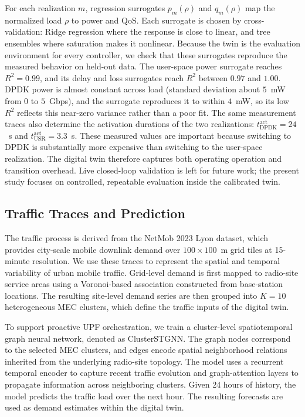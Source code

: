\documentclass[10pt,conference,letterpaper]{IEEEtran}
\begin{document}
For each realization $m$, regression surrogates $p_m(\rho)$ and $q_m(\rho)$ map
the normalized load $\rho$ to power and QoS. Each surrogate is chosen by
cross-validation: Ridge regression where the response is close to linear, and
tree ensembles where saturation makes it nonlinear. Because the twin is the
evaluation environment for every controller, we check that these surrogates
reproduce the measured behavior on held-out data. The user-space power surrogate
reaches $R^2=0.99$, and its delay and loss surrogates reach $R^2$ between $0.97$
and $1.00$. DPDK power is almost constant across load (standard deviation about
$5$~mW from $0$ to $5$~Gbps), and the surrogate reproduces it to within $4$~mW,
so its low $R^2$ reflects this near-zero variance rather than a poor fit.
The same measurement traces also determine the activation durations of the two
realizations: $t^{\mathrm{act}}_{\mathrm{DPDK}}=24$~s and
$t^{\mathrm{act}}_{\mathrm{USR}}=3.3$~s. These measured values are important
because switching to DPDK is substantially more expensive than switching to the
user-space realization. The digital twin therefore captures both operating
operation and transition overhead. Live closed-loop validation is left for
future work; the present study focuses on controlled, repeatable evaluation
inside the calibrated twin.

\subsection{Traffic Traces and Prediction}

The traffic process is derived from the NetMob 2023 Lyon dataset, which provides city-scale mobile downlink demand over $100 \times 100$~m grid tiles at 15-minute resolution. We use these traces to represent the spatial and temporal variability of urban mobile traffic. Grid-level demand is first mapped to radio-site service areas using a Voronoi-based association constructed from base-station locations. The resulting site-level demand series are then grouped into $K=10$ heterogeneous MEC clusters, which define the traffic inputs of the digital twin.

To support proactive UPF orchestration, we train a cluster-level spatiotemporal graph neural network, denoted as ClusterSTGNN. The graph nodes correspond to the selected MEC clusters, and edges encode spatial neighborhood relations inherited from the underlying radio-site topology. The model uses a recurrent temporal encoder to capture recent traffic evolution and graph-attention layers to propagate information across neighboring clusters. Given 24 hours of history, the model predicts the traffic load over the next hour. The resulting forecasts are used as demand estimates within the digital twin.
\end{document}
